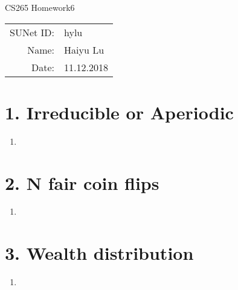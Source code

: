 \documentclass[12pt]{article}
\begin{document}
\begin{center}
{\Large CS265 Homework6}

\begin{tabular}{rl}
SUNet ID: & hylu \\
Name: & Haiyu Lu \\
Date: & 11.12.2018
\end{tabular}
\end{center}

\section*{1. Irreducible or Aperiodic}

\begin{enumerate}[label=\alph*)]
\item 
\end{enumerate}

\section*{2. N fair coin flips}

\begin{enumerate}[label=\alph*)]
\item 
\end{enumerate}

\section*{3. Wealth distribution}

\begin{enumerate}[label=\alph*)]
\item 
\end{enumerate}
\end{document}

